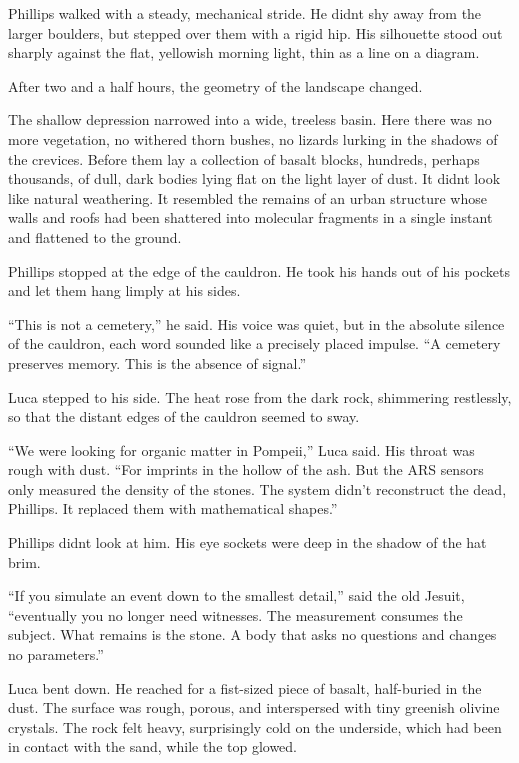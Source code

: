 \documentclass[
  ngerman,
]{article}
\begin{document}
Phillips walked with a steady, mechanical stride. He
didn\textquotesingle t shy away from the larger boulders, but stepped
over them with a rigid hip. His silhouette stood out sharply against the
flat, yellowish morning light, thin as a line on a diagram.

After two and a half hours, the geometry of the landscape changed.

The shallow depression narrowed into a wide, treeless basin. Here there
was no more vegetation, no withered thorn bushes, no lizards lurking in
the shadows of the crevices. Before them lay a collection of basalt
blocks, hundreds, perhaps thousands, of dull, dark bodies lying flat on
the light layer of dust. It didn\textquotesingle t look like natural
weathering. It resembled the remains of an urban structure whose walls
and roofs had been shattered into molecular fragments in a single
instant and flattened to the ground.

Phillips stopped at the edge of the cauldron. He took his hands out of
his pockets and let them hang limply at his sides.

``This is not a cemetery,'' he said. His voice was quiet, but in the
absolute silence of the cauldron, each word sounded like a precisely
placed impulse. ``A cemetery preserves memory. This is the absence of
signal.''

Luca stepped to his side. The heat rose from the dark rock, shimmering
restlessly, so that the distant edges of the cauldron seemed to sway.

``We were looking for organic matter in Pompeii,'' Luca said. His throat
was rough with dust. ``For imprints in the hollow of the ash. But the
ARS sensors only measured the density of the stones. The system didn't
reconstruct the dead, Phillips. It replaced them with mathematical
shapes.''

Phillips didn\textquotesingle t look at him. His eye sockets were deep
in the shadow of the hat brim.

``If you simulate an event down to the smallest detail,'' said the old
Jesuit, ``eventually you no longer need witnesses. The measurement
consumes the subject. What remains is the stone. A body that asks no
questions and changes no parameters.''

Luca bent down. He reached for a fist-sized piece of basalt, half-buried
in the dust. The surface was rough, porous, and interspersed with tiny
greenish olivine crystals. The rock felt heavy, surprisingly cold on the
underside, which had been in contact with the sand, while the top
glowed.
\end{document}
